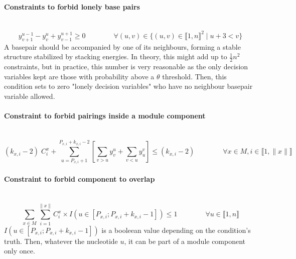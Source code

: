 \documentclass{article}
\begin{document}
\paragraph{Constraints to forbid lonely base pairs} ~
\begin{equation} \label{constraint:2}
	y^{u-1}_{v+1} - y^u_v + y^{u+1}_{v-1} \geq 0 \qquad \qquad \forall (u,v) \in \{ (u,v) \in \llbracket 1,n\rrbracket^2 \; | \; u + 3 <v \}
\end{equation}
A basepair should be accompanied by one of its neighbours, forming a stable structure stabilized by stacking energies. In theory, this might add up to \( \frac{1}{2}n^2\) constraints, but in practice, this number is very reasonable as
the only decision variables kept are those with probability above a $\theta$ threshold. 
Then, this condition sets to zero "lonely decision variables" who have no neighbour basepair variable allowed.


\paragraph{Constraint to forbid pairings inside a module component} ~ 
\begin{equation} \label{constraint:4}
	(k_{x,i}-2) \; C^x_i + \sum_{u=P_{x,i}+1}^{P_{x,i}+k_{x,i}-2}\left[ \sum_{v>u} y^u_v + \sum_{v<u} y^v_u \right] \leq (k_{x,i} - 2)
	\qquad \qquad \forall x \in M, i \in \llbracket 1,\|x\| \rrbracket
\end{equation}
	
\paragraph{Constraint to forbid component to overlap} ~
\begin{equation} \label{constraint:5}
	\sum_{x \in M} \sum_{i=1}^{\|x\|} C^x_i \times I( u \in [ P_{x,i} ; P_{x,i}+k_{x,i}-1]) \leq 1 \qquad \qquad \forall u \in \llbracket 1,n \rrbracket
\end{equation}
$I( u \in [ P_{x,i} ; P_{x,i}+k_{x,i}-1])$ is a booleean value depending on the condition's truth. Then, whatever the nucleotide $u$, it can be part of a module component only once.
	
\end{document}
